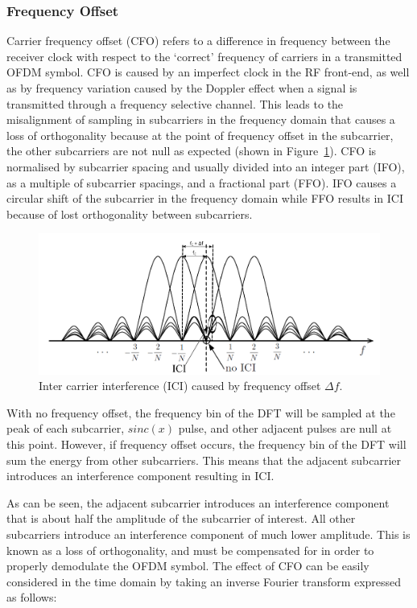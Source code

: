 \subsubsection{Frequency Offset}

Carrier frequency offset (CFO) refers to a difference in frequency between the receiver clock with respect to the `correct' frequency of carriers in a transmitted OFDM symbol.
CFO is caused by an imperfect clock in the RF front-end, as well as by frequency variation caused by the Doppler effect when a signal is transmitted through a frequency selective channel.
This leads to the misalignment of sampling in subcarriers in the frequency domain that causes a loss of orthogonality because at the point of frequency offset in the subcarrier, the other subcarriers are not null as expected (shown in Figure~\ref{fig:OFDM-subcarrier-freoff}).
CFO is normalised by subcarrier spacing and usually divided into an integer part (IFO), as a multiple of subcarrier spacings, and a fractional part (FFO).
IFO causes a circular shift of the subcarrier in the frequency domain while FFO results in ICI because of lost orthogonality between subcarriers.

\begin{figure}
	\centerline{\includegraphics [width=0.8\columnwidth] {Figures/OFDM-subcarrier-freoff.pdf} }
	\caption{Inter carrier interference (ICI) caused by frequency offset $\Delta f$.}
	\label{fig:OFDM-subcarrier-freoff}
\end{figure}

With no frequency offset, the frequency bin of the DFT will be sampled at  the peak of each subcarrier, $sinc(x)$ pulse, and other adjacent pulses are null at this point.
However, if frequency offset occurs, the frequency bin of the DFT will sum the energy from other subcarriers.
This means that the adjacent subcarrier introduces an interference component resulting in ICI.

As can be seen, the adjacent subcarrier introduces an interference component that is about half the amplitude of the subcarrier of interest.
All other subcarriers introduce an interference component of much lower amplitude.
This is known as a loss of orthogonality, and must be compensated for in order to properly demodulate the OFDM symbol.
The effect of CFO can be easily considered in the time domain by taking an inverse Fourier transform expressed as follows:

